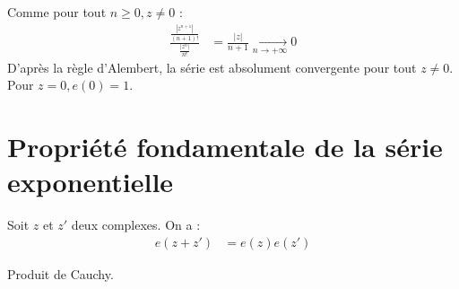 \documentclass[../main.tex]{subfiles}
\begin{document}
\noindent Comme pour tout $n\geq 0, z\neq 0$ : 
\begin{align*}
    \frac{\frac{|z^{n+1}|}{(n+1)!}}{\frac{|z^n|}{n!}} &= \frac{|z|}{n+1} \underset{n \to +\infty}{\longrightarrow} 0
\end{align*}
D'après la règle d'Alembert, la série est absolument convergente pour tout $z\neq 0$. \\
Pour $z=0, e(0) = 1$. 

\section{Propriété fondamentale de la série exponentielle}
\begin{tcolorbox}[title=Théorème 35.43, title filled=false, colframe=orange, colback=orange!10!white]
    Soit $z$ et $z'$ deux complexes. On a : 
    \begin{align*}
        e(z + z') &= e(z) e(z')
    \end{align*}
\end{tcolorbox}

\noindent Produit de Cauchy. 
\end{document}
